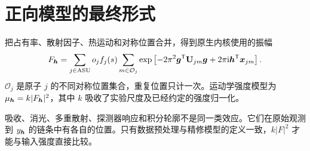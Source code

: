 \section{正向模型的最终形式}
把占有率、散射因子、热运动和对称位置合并，得到原生内核使用的振幅
\begin{equation}
F_{\bm{h}}=\sum_{j\in\mathrm{ASU}}o_j f_j(s)
\sum_{m\in\mathcal O_j}
\exp\left[-2\pi^2\bm{g}^{\mathsf T}\mathbf{U}_{jm}\bm{g}
+2\pi\mathrm{i}\bm{h}^{\mathsf T}\bm{x}_{jm}\right].
\label{eq:fullF}
\end{equation}
$\mathcal O_j$ 是原子 $j$ 的不同对称位置集合，重复位置只计一次。运动学强度模型为 $\mu_{\bm{h}}=k|F_{\bm{h}}|^2$，其中 $k$ 吸收了实验尺度及已经约定的强度归一化。

吸收、消光、多重散射、探测器响应和积分轮廓不是同一类效应。它们在原始观测到 $y_{\bm{h}}$ 的链条中有各自的位置。只有数据预处理与精修模型的定义一致，$k|F|^2$ 才能与输入强度直接比较。
